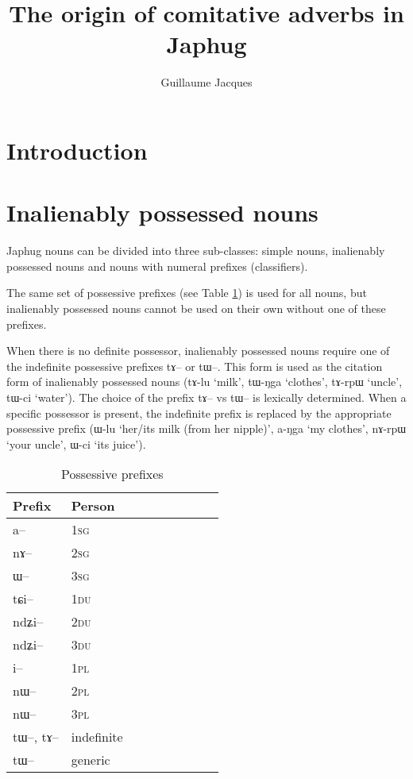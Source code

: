 \documentclass[oldfontcommands,oneside,a4paper,11pt]{article}
\newcommand{\ipa}[1]{{\phon #1}} %
\begin{document}
 
 \title{The origin of comitative adverbs in Japhug}
 \author{Guillaume Jacques}
 \maketitle  
 \section{Introduction}
\linenumbers

 \section{Inalienably possessed nouns} 
 Japhug nouns can be divided into three sub-classes: simple nouns, inalienably possessed nouns and nouns with numeral prefixes (classifiers).  

The same set of possessive prefixes (see Table \ref{tab:possessive}) is used for all nouns, but inalienably possessed nouns cannot be used on their own without one of these prefixes. 

When there is no definite possessor, inalienably possessed nouns require one of the indefinite possessive prefixes \ipa{tɤ--} or \ipa{tɯ--}. This form is used as the citation form of inalienably possessed nouns (\ipa{tɤ-lu} `milk', \ipa{tɯ-ŋga} `clothes', \ipa{tɤ-rpɯ} `uncle', \ipa{tɯ-ci} `water'). The choice of the prefix \ipa{tɤ--} vs \ipa{tɯ--} is lexically determined.  When a specific possessor is present, the indefinite prefix is replaced by the appropriate possessive prefix (\ipa{ɯ-lu} `her/its milk (from her nipple)', \ipa{a-ŋga} `my clothes', \ipa{nɤ-rpɯ} `your uncle', \ipa{ɯ-ci} `its juice'). 

\begin{table}[H] \centering
\caption{Possessive prefixes }\label{tab:possessive}
\begin{tabular}{lllllllll} 
\toprule
 Prefix & Person\\
\midrule
	\ipa{a--}  &		1\textsc{sg} \\
	\ipa{nɤ--}  &			2\textsc{sg}\\
\ipa{ɯ--}  &			3\textsc{sg}\\
\midrule
	\ipa{tɕi--}  &			1\textsc{du} \\
	\ipa{ndʑi--}  &		2\textsc{du} \\	
	\ipa{ndʑi--}  &		3\textsc{du} \\	
\midrule
	\ipa{i--}  &			1\textsc{pl} \\
		\ipa{nɯ--}  &			2\textsc{pl} \\
	\ipa{nɯ--}  &			3\textsc{pl} \\
\midrule
 \ipa{tɯ--},  \ipa{tɤ--} & indefinite \\
 \ipa{tɯ--}   &  generic\\
\bottomrule
\end{tabular}
\end{table}
\end{document}

